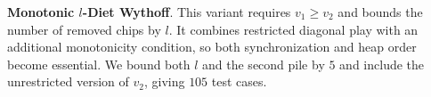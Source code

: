 \documentclass[review]{elsarticle}
\newcommand{\set}[1]{\{ #1 \}}
\newcommand{\tuple}[1]{\langle {#1} \rangle}
\newcommand{\true}{\top}
\newcommand{\statevar}{\mathcal{X}}
\newcommand{\act}{\mathcal{A}}
\newcommand{\constraint}{\mathcal{C}}
\newcommand{\estate}{\mathcal{E}}
\newcommand{\pre}{\mathtt{pre}}
\newcommand{\eff}{\mathtt{eff}}
\begin{document}
{\color{red}\textbf{Monotonic $l$-Diet Wythoff}. This variant requires $v_1 \ge v_2$ and bounds the number of removed chips by $l$.}
{\color{red}It combines restricted diagonal play with an additional monotonicity condition, so both synchronization and heap order become essential.}
{\color{red}We bound both $l$ and the second pile by $5$ and include the unrestricted version of $v_2$, giving $105$ test cases.}
\end{document}
